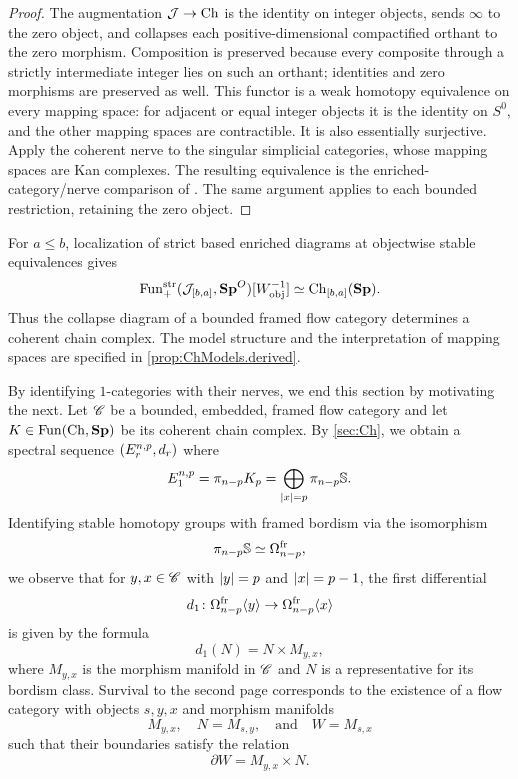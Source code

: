 \begin{proof}
The augmentation $\mathcal{J}\to\operatorname{Ch}$ is the identity on integer objects, sends $\infty$ to the zero object, and collapses each positive-dimensional compactified orthant to the zero morphism. Composition is preserved because every composite through a strictly intermediate integer lies on such an orthant; identities and zero morphisms are preserved as well. This functor is a weak homotopy equivalence on every mapping space: for adjacent or equal integer objects it is the identity on $S^0$, and the other mapping spaces are contractible. It is also essentially surjective. Apply the coherent nerve to the singular simplicial categories, whose mapping spaces are Kan complexes. The resulting equivalence is the enriched-category/nerve comparison of \cite[Theorem~2.2.5.1]{Lur09}. The same argument applies to each bounded restriction, retaining the zero object.
\end{proof}

\begin{prop}\label{prop:FF_are_Ch}
    For $a\leq b$, localization of strict based enriched diagrams at objectwise stable equivalences gives
    \[
        \operatorname{Fun}_+^{\mathrm{str}}(\mathcal{J}_{[b,a]},\mathbf{Sp}^O)
        [W_{\mathrm{obj}}^{-1}]
        \simeq\operatorname{Ch}_{[b,a]}(\mathbf{Sp}).
    \]
    Thus the collapse diagram of a bounded framed flow category determines a coherent chain complex. The model structure and the interpretation of mapping spaces are specified in \cref{prop:ChModels.derived}.
\end{prop}

By identifying $1$-categories with their nerves, we end this section by motivating the next. Let $\mathscr{C}$ be a bounded, embedded, framed flow category and let $K \in \operatorname{Fun}(\operatorname{Ch},\mathbf{Sp})$ be its coherent chain complex. By \cref{sec:Ch}, we obtain a spectral sequence $(E_r^{n,p}, d_r)$ where
\begin{equation*}
    E_{1}^{n,p} = \pi_{n-p} K_p = \bigoplus_{\left\lvert x\right\rvert=p} \pi_{n-p}\mathbb{S}.
\end{equation*}
Identifying stable homotopy groups with framed bordism via the isomorphism
\begin{equation*}
    \pi_{n-p} \mathbb{S} \simeq \Omega^{\operatorname{fr}}_{n-p},
\end{equation*}
we observe that for $y,x \in \mathscr{C}$ with $\left\lvert y\right\rvert=p$ and $\left\lvert x\right\rvert=p-1$, the first differential
\begin{equation*}
    d_1\colon \Omega^{\operatorname{fr}}_{n-p}\langle y \rangle \to \Omega^{\operatorname{fr}}_{n-p}\langle x \rangle
\end{equation*}
is given by the formula
\begin{equation*}
    d_1(N) = N \times M_{y,x},
\end{equation*}
where $M_{y,x}$ is the morphism manifold in $\mathscr{C}$ and $N$ is a representative for its bordism class. Survival to the second page corresponds to the existence of a flow category with objects $s,y,x$ and morphism manifolds
\begin{equation*}
    M_{y,x}, \quad N=M_{s,y}, \quad \text{and} \quad W=M_{s,x}
\end{equation*}
such that their boundaries satisfy the relation
\begin{equation*}
    \partial W = M_{y,x} \times N.
\end{equation*}
